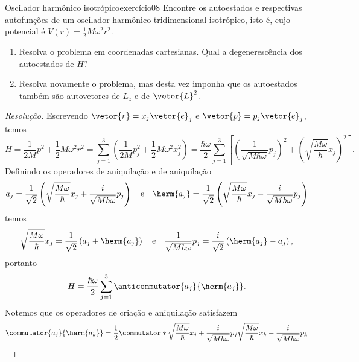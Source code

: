 \begin{exercício}{Oscilador harmônico isotrópico}{exercício08}
    Encontre os autoestados e respectivas autofunções de um oscilador harmônico tridimensional isotrópico, isto é, cujo potencial é \(V(r) = \frac12 M \omega^2 r^2\).
    \begin{enumerate}[label=(\alph*)]
        \item Resolva o problema em coordenadas cartesianas. Qual a degenerescência dos autoestados de \(H\)?
        \item Resolva novamente o problema, mas desta vez imponha que os autoestados também são autovetores de \(L_z\) e de \(\vetor{L}^2\).
    \end{enumerate}
\end{exercício}
\begin{proof}[Resolução]
    Escrevendo \(\vetor{r} = x_j \vetor{e}_j\) e \(\vetor{p} = p_j \vetor{e}_j\), temos
    \begin{equation*}
        H = \frac1{2M} p^2 + \frac12 M \omega^2 r^2 = \sum_{j= 1}^3\left(\frac1{2M} p_j^2 + \frac12 M \omega^2 x_j^2\right) = \frac{\hbar \omega}{2} \sum_{j= 1}^3 \left[\left(\frac1{\sqrt{M  \hbar\omega}}p_j\right)^2 + \left(\sqrt{\frac{M \omega}{\hbar}}x_j\right)^2\right].
    \end{equation*}
    Definindo os operadores de aniquilação e de aniquilação
    \begin{equation*}
        a_j = \frac{1}{\sqrt{2}}\left(\sqrt{\frac{M\omega}{\hbar}}x_j + \frac{i}{\sqrt{M \hbar \omega}}p_j\right)
        \quad\text{e}\quad
        \herm{a_j} = \frac{1}{\sqrt{2}}\left(\sqrt{\frac{M\omega}{\hbar}}x_j - \frac{i}{\sqrt{M \hbar \omega}}p_j\right)
    \end{equation*}
    temos
    \begin{equation*}
        \sqrt{\frac{M\omega}\hbar}x_j = \frac1{\sqrt{2}}\left(a_j + \herm{a_j}\right) \quad\text{e}\quad \frac{1}{\sqrt{M \hbar \omega}} p_j = \frac{i}{\sqrt{2}}\left(\herm{a_j} - a_j\right),
    \end{equation*}
    portanto
    \begin{equation*}
        H = \frac{\hbar \omega}{2} \sum_{j=1}^3 \anticommutator{a_j}{\herm{a_j}}.
    \end{equation*}
    Notemos que os operadores de criação e aniquilação satisfazem
    \begin{align*}
        \commutator{a_j}{\herm{a_k}} &= \frac12\commutator*{\sqrt{\frac{M\omega}{\hbar}}x_j + \frac{i}{\sqrt{M \hbar \omega}}p_j}{\sqrt{\frac{M\omega}{\hbar}}x_k - \frac{i}{\sqrt{M \hbar \omega}}p_k}\\

\end{align*}
\end{proof}
